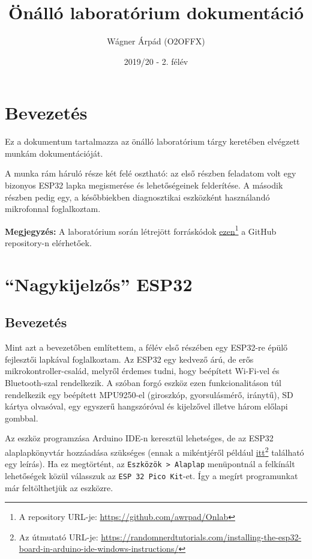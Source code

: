 \documentclass[12pt,a4paper]{article}
\title{Önálló laboratórium dokumentáció}
\author{Wágner Árpád (O2OFFX)}
\date{2019/20 - 2. félév}
\begin{document}
  \maketitle

  \section{Bevezetés}

    Ez a dokumentum tartalmazza az önálló laboratórium tárgy keretében elvégzett munkám dokumentációját.

    A munka rám háruló része két felé osztható: az első részben feladatom volt egy bizonyos ESP32 lapka megismerése és lehetőségeinek felderítése. A második részben pedig egy, a későbbiekben diagnosztikai eszközként használandó mikrofonnal foglalkoztam.

    \textbf{Megjegyzés:} A laboratórium során létrejött forráskódok \href{https://github.com/awrpad/Onlab}{ezen}\footnote{A repository URL-je: \url{https://github.com/awrpad/Onlab}} a GitHub repository-n elérhetőek.

  \newpage

  \section{``Nagykijelzős'' ESP32}

    \subsection{Bevezetés}
      Mint azt a bevezetőben említettem, a félév első részében egy ESP32-re épülő fejlesztői lapkával foglalkoztam.
      Az ESP32 egy kedvező árú, de erős mikrokontroller-család, melyről érdemes tudni, hogy beépített Wi-Fi-vel és Bluetooth-szal rendelkezik. A szóban forgó eszköz ezen funkcionalitáson túl rendelkezik egy beépített MPU9250-el (giroszkóp, gyorsulásmérő, iránytű), SD kártya olvasóval, egy egyszerű hangszóróval és kijelzővel illetve három előlapi gombbal.

      Az eszköz programzása Arduino IDE-n keresztül lehetséges, de az ESP32 alaplapkönyvtár hozzáadása szükséges (ennak a mikéntjéről például \href{https://randomnerdtutorials.com/installing-the-esp32-board-in-arduino-ide-windows-instructions/}{itt}\footnote{Az útmutató URL-je: \url{https://randomnerdtutorials.com/installing-the-esp32-board-in-arduino-ide-windows-instructions/}} található egy leírás). Ha ez megtörtént, az \texttt{Eszközök > Alaplap} menüpontnál a felkínált lehetőségek közül válasszuk az \texttt{ESP 32 Pico Kit}-et. Így a megírt programunkat már feltölthetjük az eszközre.
\end{document}
